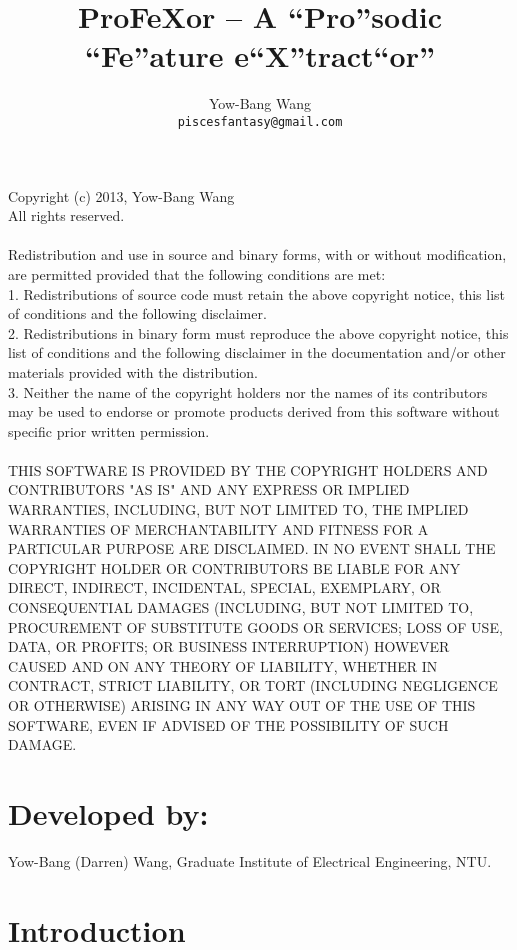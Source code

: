 \documentclass[12pt]{article}
\title{ProFeXor -- A ``Pro''sodic ``Fe''ature e``X''tract``or''}
\author{Yow-Bang Wang\\
\texttt{piscesfantasy@gmail.com}}
\affil{Graduate Institute of Electrical Engineering,\\
National Taiwan University (NTU),\\
Taipei, Taiwan.}
\begin{document}
\maketitle

{\footnotesize
\noindent
Copyright (c) 2013, Yow-Bang Wang\\
All rights reserved.\\
\\
Redistribution and use in source and binary forms, with or without modification, are permitted provided that the following conditions are met:\\
1. Redistributions of source code must retain the above copyright notice, this list of conditions and the following disclaimer.\\
2. Redistributions in binary form must reproduce the above copyright notice, this list of conditions and the following disclaimer in the documentation and/or other materials provided with the distribution.\\
3. Neither the name of the copyright holders nor the names of its contributors may be used to endorse or promote products derived from this software without specific prior written permission.\\
\\
THIS SOFTWARE IS PROVIDED BY THE COPYRIGHT HOLDERS AND CONTRIBUTORS "AS IS" AND ANY EXPRESS OR IMPLIED WARRANTIES, INCLUDING, BUT NOT LIMITED TO, THE IMPLIED WARRANTIES OF MERCHANTABILITY AND FITNESS FOR A PARTICULAR PURPOSE ARE DISCLAIMED. IN NO EVENT SHALL THE COPYRIGHT HOLDER OR CONTRIBUTORS BE LIABLE FOR ANY DIRECT, INDIRECT, INCIDENTAL, SPECIAL, EXEMPLARY, OR CONSEQUENTIAL DAMAGES (INCLUDING, BUT NOT LIMITED TO, PROCUREMENT OF SUBSTITUTE GOODS OR SERVICES; LOSS OF USE, DATA, OR PROFITS; OR BUSINESS INTERRUPTION) HOWEVER CAUSED AND ON ANY THEORY OF LIABILITY, WHETHER IN CONTRACT, STRICT LIABILITY, OR TORT (INCLUDING NEGLIGENCE OR OTHERWISE) ARISING IN ANY WAY OUT OF THE USE OF THIS SOFTWARE, EVEN IF ADVISED OF THE POSSIBILITY OF SUCH DAMAGE.\\
}

\section*{Developed by:}
\noindent
Yow-Bang (Darren) Wang, Graduate Institute of Electrical Engineering, NTU.\\

\section{Introduction}
\end{document}
